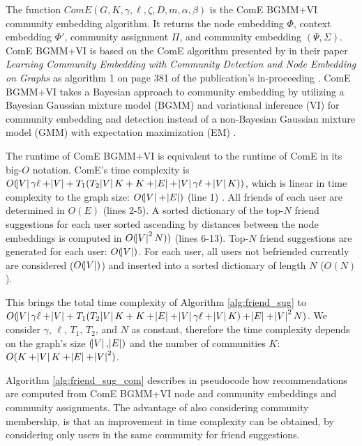 \documentclass[conference]{IEEEtran}
\begin{document}
The function $ComE(G, K, \gamma, \ell, \zeta, D, m, \alpha, \beta)$ is the ComE BGMM+VI community embedding algorithm. It returns the node embedding $\Phi$, context embedding $\Phi'$, community assignment $\Pi$, and community embedding $(\Psi,\Sigma)$. ComE BGMM+VI is based on the ComE algorithm presented by \citeauthor{ComE} in their paper \textit{Learning Community Embedding with Community Detection and Node Embedding on Graphs} as algorithm 1 on page 381 of the publication's in-proceeding \cite{ComE}. ComE BGMM+VI takes a Bayesian approach to community embedding by utilizing  a Bayesian Gaussian mixture model (BGMM) and variational inference (VI) for community embedding and detection instead of a non-Bayesian Gaussian mixture model (GMM) with expectation maximization (EM) \cite{ComE_BGMM_GH}. %

The runtime of ComE BGMM+VI is equivalent to the runtime of ComE in its big-$O$ notation. ComE's time complexity is $O(\abs{V}\gamma\ell + \abs{V} + T_1 (T_2\abs{V}K + K + \abs{E} + \abs{V}\gamma\ell + \abs{V}K))$, which is linear in time complexity to the graph size: $O(\abs{V} + \abs{E})$ (line 1) \cite{ComE}. All friends of each user are determined in $O(E)$ (lines 2-5). A sorted dictionary of the top-$N$ friend suggestions for each user sorted ascending by distances between the node embeddings is computed in $O(\abs{V}^2N))$ (lines 6-13). Top-$N$ friend suggestions are generated for each user: $O(\abs{V})$. For each user, all users not befriended currently are considered ($O(\abs{V})$) and inserted into a sorted dictionary of length $N$ ($O(N)$).

This brings the total time complexity of Algorithm \ref{alg:friend_sug} to $O(\abs{V}\gamma\ell + \abs{V} + T_1 (T_2\abs{V}K + K + \abs{E} + \abs{V}\gamma\ell + \abs{V}K) + \abs{E} + \abs{V}^2N)$. We consider $\gamma$, $\ell$, $T_1$, $T_2$, and $N$ as constant, therefore the time complexity depends on the graph's size $(\abs{V}, \abs{E})$ and the number of communities $K$: $O(K + \abs{V}K + \abs{E} + \abs{V}^2)$.

Algorithm \ref{alg:friend_sug_com} describes in pseudocode how recommendations are computed from ComE BGMM+VI node and community embeddings and community assignments. The advantage of also considering community membership, is that an improvement in time complexity can be obtained, by considering only users in the same community for friend suggestions.
\end{document}
